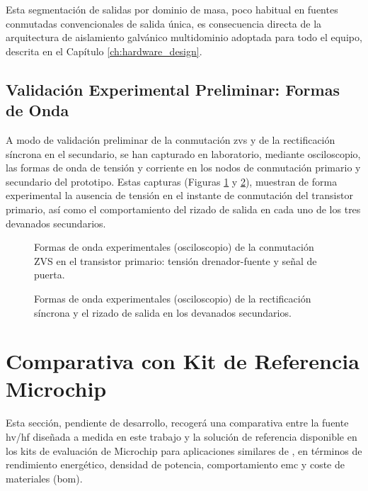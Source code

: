 Esta segmentación de salidas por dominio de masa, poco habitual en fuentes conmutadas convencionales de salida única, es consecuencia directa de la arquitectura de aislamiento galvánico multidominio adoptada para todo el equipo, descrita en el Capítulo \ref{ch:hardware_design}.

\subsection{Validación Experimental Preliminar: Formas de Onda}
\label{subsec:validacion_formas_onda}

A modo de validación preliminar de la conmutación \gls{zvs} y de la rectificación síncrona en el secundario, se han capturado en laboratorio, mediante osciloscopio, las formas de onda de tensión y corriente en los nodos de conmutación primario y secundario del prototipo. Estas capturas (Figuras \ref{fig:formas_onda_zvs} y \ref{fig:formas_onda_rectificacion_sincrona}), muestran de forma experimental la ausencia de tensión en el instante de conmutación del transistor primario, así como el comportamiento del rizado de salida en cada uno de los tres devanados secundarios.

\begin{figure}[htbp]
    \centering
    \caption{Formas de onda experimentales (osciloscopio) de la conmutación ZVS en el transistor primario: tensión drenador-fuente y señal de puerta.}
    \label{fig:formas_onda_zvs}
\end{figure}

\begin{figure}[htbp]
    \centering
    \caption{Formas de onda experimentales (osciloscopio) de la rectificación síncrona y el rizado de salida en los devanados secundarios.}
    \label{fig:formas_onda_rectificacion_sincrona}
\end{figure}

\section{Comparativa con Kit de Referencia Microchip}
\label{sec:comparativa_microchip}


Esta sección, pendiente de desarrollo, recogerá una comparativa entre la fuente \gls{hv}/\gls{hf} diseñada a medida en este trabajo y la solución de referencia disponible en los kits de evaluación de Microchip para aplicaciones similares de , en términos de rendimiento energético, densidad de potencia, comportamiento \gls{emc} y coste de materiales (\gls{bom}).

